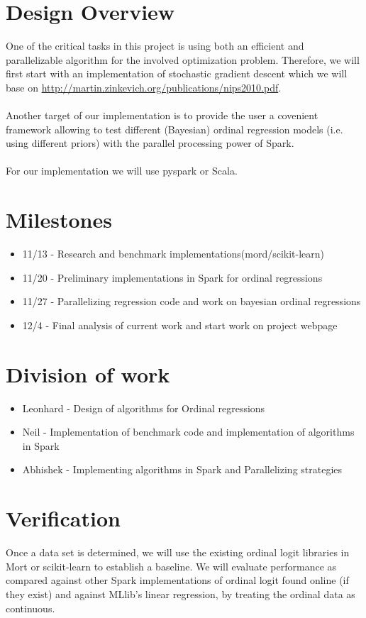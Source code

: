\documentclass{article}
\begin{document}
	\section{Design Overview}
	One of the critical tasks in this project is using both an efficient and parallelizable algorithm for the involved optimization problem. Therefore, we will first start with an implementation of stochastic gradient descent which we will base on \href{Reference}{http://martin.zinkevich.org/publications/nips2010.pdf}.
	\\
	\\
	Another target of our implementation is to provide the user a covenient framework allowing to test different (Bayesian) ordinal regression models (i.e. using different priors) with the parallel processing power of Spark.
	\\
	\\
	For our implementation we will use pyspark or Scala.


	\section{Milestones}
		\begin{itemize}
			\item 11/13 - Research and benchmark implementations(mord/scikit-learn)
			\item 11/20 - Preliminary implementations in Spark for ordinal regressions
			\item 11/27 - Parallelizing regression code and work on bayesian ordinal regressions
			\item 12/4 - Final analysis of current work and start work on project webpage
		\end{itemize}

	\section{Division of work}
		\begin{itemize}
			\item Leonhard - Design of algorithms for Ordinal regressions
			\item Neil - Implementation of benchmark code and implementation of algorithms in Spark
			\item Abhishek - Implementing algorithms in Spark and Parallelizing strategies
		\end{itemize}


	\section{Verification}
	Once a data set is determined, we will use the existing ordinal logit libraries in Mort or scikit-learn to establish a baseline. We will evaluate performance as compared against other Spark implementations of ordinal logit found online (if they exist) and against MLlib's linear regression, by treating the ordinal data as continuous.
\end{document}
